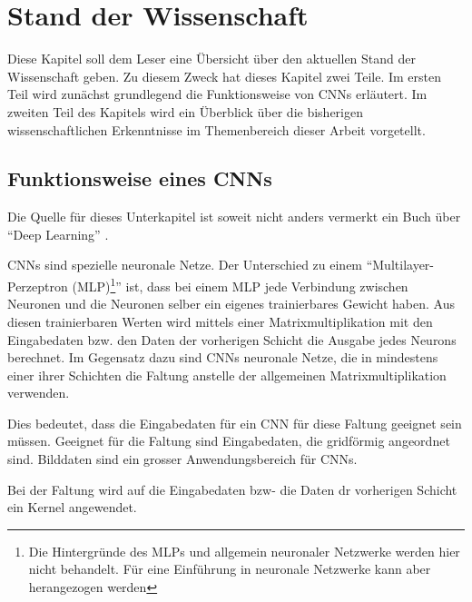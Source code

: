 \chapter{Stand der Wissenschaft}
Diese Kapitel soll dem Leser eine Übersicht über den aktuellen Stand der Wissenschaft geben. Zu diesem Zweck hat dieses Kapitel zwei Teile. Im ersten Teil wird zunächst grundlegend die Funktionsweise von CNNs erläutert. Im zweiten Teil des Kapitels wird ein Überblick über die bisherigen wissenschaftlichen Erkenntnisse im Themenbereich dieser Arbeit vorgetellt.
\section{Funktionsweise eines CNNs}\label{sec:conv}
Die Quelle für dieses Unterkapitel ist soweit nicht anders vermerkt ein Buch über \enquote{Deep Learning} \cite{CNNBook}.

CNNs sind spezielle neuronale Netze. Der Unterschied zu einem \enquote{Multilayer-Perzeptron (MLP)\footnote{Die Hintergründe des MLPs und allgemein neuronaler Netzwerke werden hier nicht behandelt. Für eine Einführung in neuronale Netzwerke kann aber \cite{neural} herangezogen werden}} ist, dass bei einem MLP jede Verbindung zwischen Neuronen und die Neuronen selber ein eigenes trainierbares Gewicht haben. Aus diesen trainierbaren Werten wird mittels einer Matrixmultiplikation mit den Eingabedaten bzw. den Daten der vorherigen Schicht die Ausgabe jedes Neurons berechnet.
Im Gegensatz dazu sind CNNs neuronale Netze, die in mindestens einer ihrer Schichten die Faltung anstelle der allgemeinen Matrixmultiplikation verwenden.


Dies bedeutet, dass die Eingabedaten für ein CNN für diese Faltung geeignet sein müssen. Geeignet für die Faltung sind Eingabedaten, die gridförmig angeordnet sind. Bilddaten sind ein grosser Anwendungsbereich für CNNs.

Bei der Faltung wird auf die Eingabedaten bzw- die Daten dr vorherigen Schicht ein Kernel angewendet.

